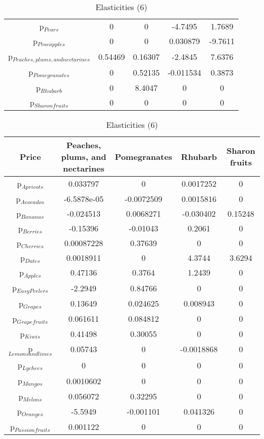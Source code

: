 \documentclass[11pt]{article}
\begin{document}
\begin{table}[h]
\begin{center}
\begin{table}[h]
\begin{center}
\begin{tabular}{ccccc}
p$_{Pears}$ & 0 & 0 & -4.7495 & 1.7689 \\ 
p$_{Pineapples}$ & 0 & 0 & 0.030879 & -9.7611 \\ 
p$_{Peaches, plums, and nectarines}$ & 0.54469 & 0.16307 & -2.4845 & 7.6376 \\ 
p$_{Pomegranates}$ & 0 & 0.52135 & -0.011534 & 0.3873 \\ 
p$_{Rhubarb}$ & 0 & 8.4047 & 0 & 0 \\ 
p$_{Sharon fruits}$ & 0 & 0 & 0 & 0 \\ 
\end{tabular}
\end{center}
\end{table}
\begin{table}[h]
\caption{Elasticities (6)}
\label{Table: elasticities 6}
\begin{center}
\begin{tabular}{ccccc}
Price & Peaches, plums, and nectarines & Pomegranates & Rhubarb & Sharon fruits \\ \hline
p$_{Apricots}$ & 0.033797 & 0 & 0.0017252 & 0 \\ 
p$_{Avocados}$ & -6.5878e-05 & -0.0072509 & 0.0015816 & 0 \\ 
p$_{Bananas}$ & -0.024513 & 0.0068271 & -0.030402 & 0.15248 \\ 
p$_{Berries}$ & -0.15396 & -0.01043 & 0.2061 & 0 \\ 
p$_{Cherries}$ & 0.00087228 & 0.37639 & 0 & 0 \\ 
p$_{Dates}$ & 0.0018911 & 0 & 4.3744 & 3.6294 \\ 
p$_{Apples}$ & 0.47136 & 0.3764 & 1.2439 & 0 \\ 
p$_{Easy Peelers}$ & -2.2949 & 0.84766 & 0 & 0 \\ 
p$_{Grapes}$ & 0.13649 & 0.024625 & 0.008943 & 0 \\ 
p$_{Grapefruits}$ & 0.061611 & 0.084812 & 0 & 0 \\ 
p$_{Kiwis}$ & 0.41498 & 0.30055 & 0 & 0 \\ 
p$_{Lemons and limes}$ & 0.05743 & 0 & -0.0018868 & 0 \\ 
p$_{Lychees}$ & 0 & 0 & 0 & 0 \\ 
p$_{Mangos}$ & 0.0010602 & 0 & 0 & 0 \\ 
p$_{Melons}$ & 0.056072 & 0.32295 & 0 & 0 \\ 
p$_{Oranges}$ & -5.5949 & -0.001101 & 0.041326 & 0 \\ 
p$_{Passion fruits}$ & 0.001122 & 0 & 0 & 0 \\ 

\end{tabular}
\end{center}
\end{table}
\end{center}
\end{table}
\end{document}
